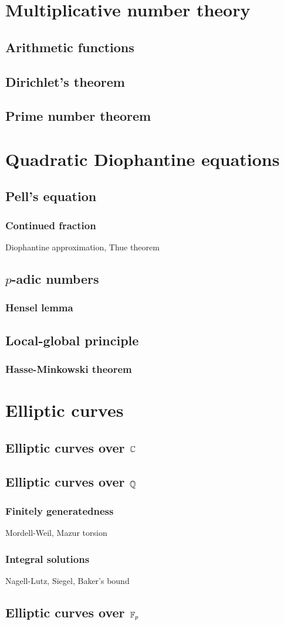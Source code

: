 \documentclass{../../large}
\begin{document}
\part{Multiplicative number theory}
\chapter{Arithmetic functions}
\chapter{Dirichlet's theorem}
\chapter{Prime number theorem}




\part{Quadratic Diophantine equations}
\chapter{Pell's equation}
\section{Continued fraction}
Diophantine approximation, Thue theorem
\chapter{$p$-adic numbers}
\section{Hensel lemma}
\chapter{Local-global principle}
\section{Hasse-Minkowski theorem}




\part{Elliptic curves}
\chapter{Elliptic curves over $\mathbb{C}$}
\chapter{Elliptic curves over $\mathbb{Q}$}
\section{Finitely generatedness}
Mordell-Weil, Mazur torsion
\section{Integral solutions}
Nagell-Lutz, Siegel, Baker's bound
\chapter{Elliptic curves over $\mathbb{F}_p$}
\end{document}
